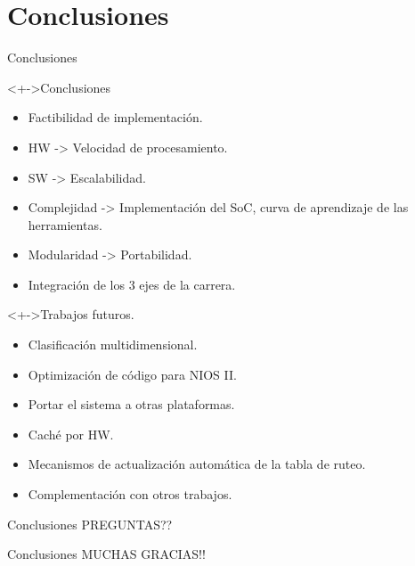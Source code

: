 \documentclass[xcolor=dvipsnames]{beamer}
\begin{document}
\section{Conclusiones}
\begin{frame}{Conclusiones} 
\begin{block}<+->{Conclusiones}   
    \begin{itemize}
      \scriptsize
     	\item Factibilidad de implementación.
     	\item HW -> Velocidad de procesamiento.
     	\item SW -> Escalabilidad.
     	\item Complejidad -> Implementación del SoC, curva de aprendizaje de las herramientas.
     	\item Modularidad -> Portabilidad.
     	\item Integración de los 3 ejes de la carrera.      	
    \end{itemize}
  \end{block}
  \begin{block}<+->{Trabajos futuros.}   
    \begin{itemize}
      \scriptsize
     	\item Clasificación multidimensional.
     	\item Optimización de código para NIOS II.
     	\item Portar el sistema a otras plataformas.
     	\item Caché por HW.
     	\item Mecanismos de actualización automática de la tabla de ruteo.
     	\item Complementación con otros trabajos.     	
    \end{itemize}
  \end{block}
\end{frame}

\begin{frame}{Conclusiones}
	\large PREGUNTAS??
\end{frame}

\begin{frame}{Conclusiones}
	\large MUCHAS GRACIAS!!
\end{frame}
\end{document}
